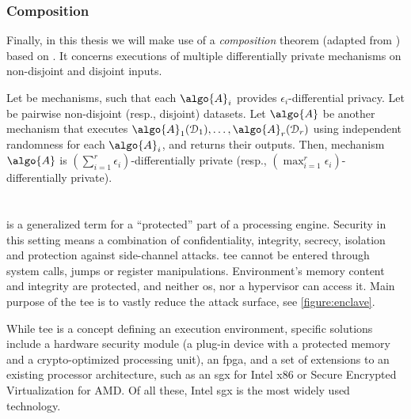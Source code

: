 			\subsubsection{Composition}

				Finally, in this thesis we will make use of a \emph{composition} theorem (adapted from \cite{privacy-integrated-queries}) based on \cite{differential-privacy-original,our-data-ourselves}. %
				It concerns executions of multiple differentially private mechanisms on non-disjoint and disjoint inputs.

				\begin{theorem}\label{theorem:composition}
					Let  be mechanisms, such that each $\algo{A}_i$ provides $\epsilon_i$-differential privacy.
					Let  be pairwise non-disjoint (resp., disjoint) datasets.
					Let $\algo{A}$ be another mechanism that executes $\algo{A}_1(\database_1), \ldots, \algo{A}_r(\database_r)$ using independent randomness for each $\algo{A}_i$, and returns their outputs.
					Then, mechanism $\algo{A}$ is $\left( \sum_{i=1}^r \epsilon_i \right)$-differentially private (resp., $\left( \max_{i=1}^r \epsilon_i \right)$-differentially private).
				\end{theorem}

	\section{\texorpdfstring{}{Trusted Execution Environments}}

		 is a generalized term for a ``protected'' part of a processing engine.
		Security in this setting means a combination of confidentiality, integrity, secrecy, isolation and protection against side-channel attacks.
		\acrshort{tee} cannot be entered through system calls, jumps or register manipulations.
		Environment's memory content and integrity are protected, and neither \acrshort{os}, nor a hypervisor can access it.
		Main purpose of the \acrshort{tee} is to vastly reduce the attack surface, see \cref{figure:enclave}.

		

		While \acrshort{tee} is a concept defining an execution environment, specific solutions include a hardware security module (a plug-in device with a protected memory and a crypto-optimized processing unit), an \acrshort{fpga}, and a set of extensions to an existing processor architecture, such as an \acrshort{sgx} for Intel x86 or Secure Encrypted Virtualization \cite{amd-memory-encryption} for AMD\@.
		Of all these, Intel \acrshort{sgx} is the most widely used technology.

